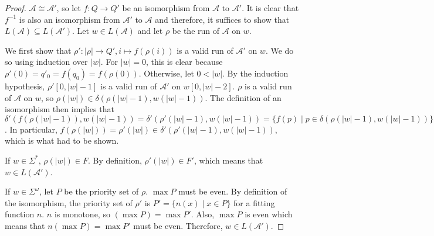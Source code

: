 \begin{proof}
	$\mathcal{A} \cong \mathcal{A}'$, so let $f : Q \rightarrow Q'$ be an isomorphism from $\mathcal{A}$ to $\mathcal{A}'$. It is clear that $f^{-1}$ is also an isomorphism from $\mathcal{A}'$ to $\mathcal{A}$ and therefore, it suffices to show that $L(\mathcal{A}) \subseteq L(\mathcal{A}')$. Let $w \in L(\mathcal{A})$ and let $\rho$ be the run of $\mathcal{A}$ on $w$.
	
	We first show that $\rho' : |\rho| \rightarrow Q', i \mapsto f(\rho(i))$ is a valid run of $\mathcal{A}'$ on $w$. We do so using induction over $|w|$. For $|w| = 0$, this is clear because $\rho'(0) = q'_0 = f(q_0) = f(\rho(0))$. Otherwise, let $0 < |w|$. By the induction hypothesis, $\rho'[0, |w|-1]$ is a valid run of $\mathcal{A}'$ on $w[0, |w|-2]$. $\rho$ is a valid run of $\mathcal{A}$ on $w$, so $\rho(|w|) \in \delta(\rho(|w|-1), w(|w|-1))$. The definition of an isomorphism then implies that $\delta'(f(\rho(|w|-1)), w(|w|-1)) = \delta'(\rho'(|w|-1), w(|w|-1)) = \{f(p) \mid p \in \delta(\rho(|w|-1), w(|w|-1))\}$. In particular, $f(\rho(|w|)) = \rho'(|w|) \in \delta'(\rho'(|w|-1), w(|w|-1))$, which is what had to be shown.
	
	If $w \in \Sigma^*$, $\rho(|w|) \in F$. By definition, $\rho'(|w|) \in F'$, which means that $w \in L(\mathcal{A}')$.
	
	If $w \in \Sigma^\omega$, let $P$ be the priority set of $\rho$. $\max P$ must be even. By definition of the isomorphism, the priority set of $\rho'$ is $P' = \{n(x) \mid x \in P\}$ for a fitting function $n$. $n$ is monotone, so $(\max P) = \max P'$. Also, $\max P$ is even which means that $n(\max P) = \max P'$ must be even. Therefore, $w \in L(\mathcal{A}')$.
\end{proof}
